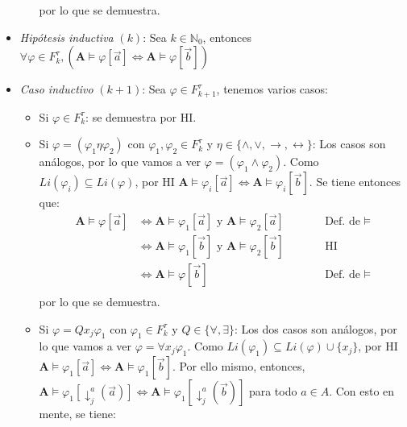\documentclass{article}
\begin{document}
\begin{itemize}
\begin{itemize}
                por lo que se demuestra.
        \end{itemize}
  \item \textit{Hipótesis inductiva} $(k)$: Sea $k\in\mathbb{N}_0$, entonces $\forall\varphi\in F^\tau_k,(\mathbf{A}\vDash\varphi[\vec{a}]\iff\mathbf{A}\vDash\varphi[\vec{b}])$
  \item \textit{Caso inductivo} $(k+1)$: Sea $\varphi\in F^\tau_{k+1}$, tenemos varios casos:
        \begin{itemize}
          \item Si $\varphi\in F^\tau_k$: se demuestra por HI.
          \item Si $\varphi=(\varphi_1\eta\varphi_2)$ con $\varphi_1,\varphi_2\in F^\tau_k$ y $\eta\in\{\land,\lor,\to,\leftrightarrow\}$: Los casos son análogos, por lo que vamos a ver $\varphi=(\varphi_1\land\varphi_2)$. Como $Li(\varphi_i)\subseteq Li(\varphi)$, por HI $\mathbf{A}\vDash\varphi_i[\vec{a}]\iff\mathbf{A}\vDash\varphi_i[\vec{b}]$. Se tiene entonces que:
                \begin{equation*}
                  \begin{alignedat}{2}
                    \mathbf{A}\vDash\varphi[\vec{a}] & \iff \mathbf{A}\vDash\varphi_1[\vec{a}]\text{ y }\mathbf{A}\vDash\varphi_2[\vec{a}] &  & \qquad\text{Def. de }\vDash \\
                                                     & \iff \mathbf{A}\vDash\varphi_1[\vec{b}]\text{ y }\mathbf{A}\vDash\varphi_2[\vec{b}] &  & \qquad\text{HI}             \\
                                                     & \iff \mathbf{A}\vDash\varphi[\vec{b}]                                               &  & \qquad\text{Def. de }\vDash \\
                  \end{alignedat}
                \end{equation*}
                por lo que se demuestra.
          \item Si $\varphi=Qx_j\varphi_1$ con $\varphi_1\in F^\tau_k$ y $Q\in\{\forall,\exists\}$: Los dos casos son análogos, por lo que vamos a ver $\varphi=\forall x_j\varphi_1$. Como $Li(\varphi_1)\subseteq Li(\varphi)\cup\{x_j\}$, por HI $\mathbf{A}\vDash\varphi_1[\vec{a}]\iff\mathbf{A}\vDash\varphi_1[\vec{b}]$. Por ello mismo, entonces, $\mathbf{A}\vDash\varphi_1[\downarrow^a_j(\vec{a})]\iff\mathbf{A}\vDash\varphi_1[\downarrow^a_j(\vec{b})]$ para todo $a\in A$. Con esto en mente, se tiene:
                \begin{equation*}

\end{equation*}
\end{itemize}
\end{itemize}
\end{document}
